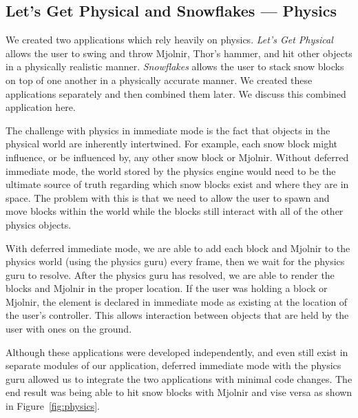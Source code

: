 \documentclass[conference,12pt]{IEEEtran}
\begin{document}
\subsection{Let's Get Physical and Snowflakes --- Physics}

We created two applications which rely heavily on physics. \textit{Let's Get
Physical} allows the user to swing and throw Mjolnir, Thor's hammer, and hit
other objects in a physically realistic manner. \textit{Snowflakes} allows the
user to stack snow blocks on top of one another in a physically accurate manner.
We created these applications separately and then combined them later. We
discuss this combined application here.

The challenge with physics in immediate mode is the fact that objects in the
physical world are inherently intertwined. For example, each snow block might
influence, or be influenced by, any other snow block or Mjolnir. Without
deferred immediate mode, the world stored by the physics engine would need to be
the ultimate source of truth regarding which snow blocks exist and where they
are in space. The problem with this is that we need to allow the user to spawn
and move blocks within the world while the blocks still interact with all of the
other physics objects.

With deferred immediate mode, we are able to add each block and Mjolnir to the
physics world (using the physics guru) every frame, then we wait for the physics
guru to resolve. After the physics guru has resolved, we are able to render
the blocks and Mjolnir in the proper location. If the user was holding a block
or Mjolnir, the element is declared in immediate mode as existing at the
location of the user's controller. This allows interaction between objects that
are held by the user with ones on the ground.

Although these applications were developed independently, and even still exist
in separate modules of our application, deferred immediate mode with the physics
guru allowed us to integrate the two applications with minimal code changes. The
end result was being able to hit snow blocks with Mjolnir and vise versa as
shown in Figure~\ref{fig:physics}.
\end{document}

